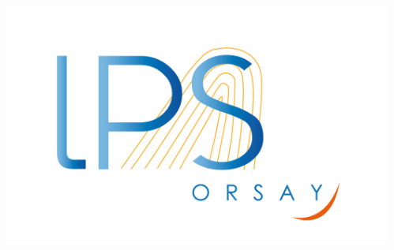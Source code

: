 \documentclass[xcolor=x11names,compress,professionalfonts, aspectratio=169]{beamer}
\renewcommand{\(}{\begin{columns}}
\renewcommand{\)}{\end{columns}}
\newcommand{\<}[1]{\begin{column}{#1}}
\renewcommand{\>}{\end{column}}
\begin{document}
\begin{frame}
\begin{columns}
\begin{column}{6cm}
\end{column}
\begin{column}{2cm}
~\\
~\\
~\\
~\\
\raggedleft
\includegraphics[scale=.15]{img/0_cover/logo-lps.jpg}
\end{column}
\end{columns}
\end{frame}


\end{document}
